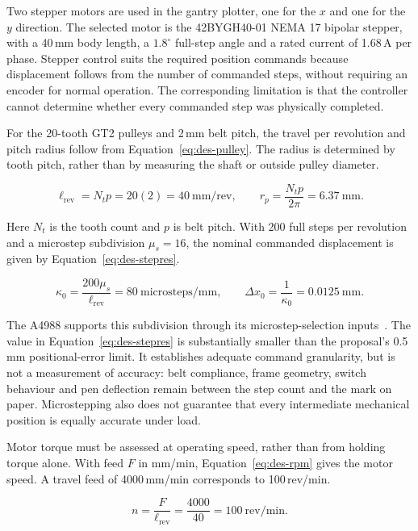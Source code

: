 Two stepper motors are used in the gantry plotter, one for the $x$ and one for the $y$ direction. The selected motor is the 42BYGH40-01 NEMA 17 bipolar stepper, with a 40\,mm body length, a $1.8^\circ$ full-step angle and a rated current of 1.68\,A per phase. Stepper control suits the required position commands because displacement follows from the number of commanded steps, without requiring an encoder for normal operation. The corresponding limitation is that the controller cannot determine whether every commanded step was physically completed.

For the 20-tooth GT2 pulleys and 2\,mm belt pitch, the travel per revolution and pitch radius follow from Equation~\ref{eq:des-pulley}. The radius is determined by tooth pitch, rather than by measuring the shaft or outside pulley diameter.

\begin{equation}
\ell_{\mathrm{rev}}=N_t p=20(2)=40\ \mathrm{mm/rev},\qquad
r_p=\frac{N_t p}{2\pi}=6.37\ \mathrm{mm}.
\label{eq:des-pulley}
\end{equation}

Here $N_t$ is the tooth count and $p$ is belt pitch. With 200 full steps per revolution and a microstep subdivision $\mu_s=16$, the nominal commanded displacement is given by Equation~\ref{eq:des-stepres}.

\begin{equation}
\kappa_0=\frac{200\mu_s}{\ell_{\mathrm{rev}}}=80\ \mathrm{microsteps/mm},\qquad
\Delta x_0=\frac{1}{\kappa_0}=0.0125\ \mathrm{mm}.
\label{eq:des-stepres}
\end{equation}

The A4988 supports this subdivision through its microstep-selection inputs~\cite[p.~6, Table~1]{a4988ds}. The value in Equation~\ref{eq:des-stepres} is substantially smaller than the proposal's 0.5\,mm positional-error limit. It establishes adequate command granularity, but is not a measurement of accuracy: belt compliance, frame geometry, switch behaviour and pen deflection remain between the step count and the mark on paper. Microstepping also does not guarantee that every intermediate mechanical position is equally accurate under load.

Motor torque must be assessed at operating speed, rather than from holding torque alone. With feed $F$ in mm/min, Equation~\ref{eq:des-rpm} gives the motor speed. A travel feed of 4000\,mm/min corresponds to 100\,rev/min.

\begin{equation}
n=\frac{F}{\ell_{\mathrm{rev}}}=\frac{4000}{40}=100\ \mathrm{rev/min}.
\label{eq:des-rpm}
\end{equation}

